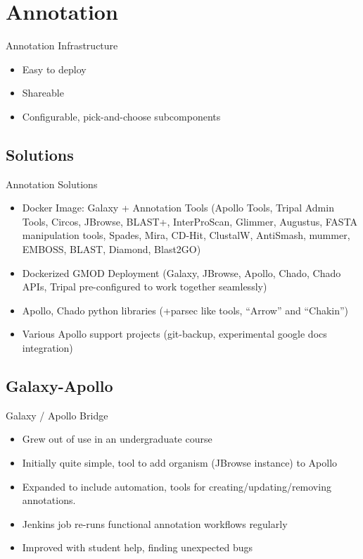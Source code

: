 \documentclass[12pt]{phage3slides} %
\begin{document}
\section{Annotation}
\begin{frame}{Annotation Infrastructure}
    \begin{itemize}
        \item Easy to deploy
        \item Shareable
        \item Configurable, pick-and-choose subcomponents
    \end{itemize}
\end{frame}

\subsection{Solutions}
\begin{frame}{Annotation Solutions}
    \begin{itemize}
        \item Docker Image: Galaxy + Annotation Tools {\color{gray}(Apollo Tools, Tripal Admin Tools, Circos, JBrowse, BLAST+, InterProScan, Glimmer, Augustus, FASTA manipulation tools, Spades, Mira, CD-Hit, ClustalW, AntiSmash, mummer, EMBOSS, BLAST, Diamond, Blast2GO)}
        \item Dockerized GMOD Deployment {\color{gray}(Galaxy, JBrowse, Apollo, Chado, Chado APIs, Tripal pre-configured to work together seamlessly)}
        \item Apollo, Chado python libraries {\color{gray}(+parsec like tools, ``Arrow'' and ``Chakin'')}
        \item Various Apollo support projects {\color{gray}(git-backup, experimental google docs integration)}
    \end{itemize}
\end{frame}

\subsection{Galaxy-Apollo}
\begin{frame}{Galaxy / Apollo Bridge}
    \begin{itemize}
        \item Grew out of use in an undergraduate course
        \item Initially quite simple, tool to add organism (JBrowse instance) to Apollo
        \item Expanded to include automation, tools for creating/updating/removing annotations.
        \item Jenkins job re-runs functional annotation workflows regularly
        \item Improved with student help, finding unexpected bugs
    \end{itemize}
\end{frame}
\end{document}
